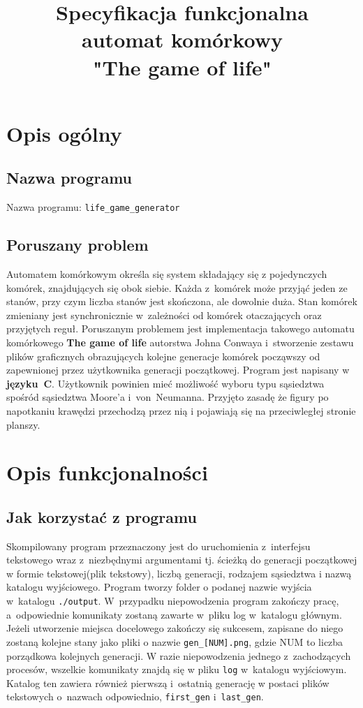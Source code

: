 \documentclass[a4paper,11pt]{article}
\author{}
\title{
	\Huge Specyfikacja funkcjonalna \\
	automat komórkowy\\
	\textbf{"The game of life"}
}
\begin{document}
 
	\maketitle 
	\newpage
	\tableofcontents 
	\newpage
	\section {Opis ogólny}
		\subsection{Nazwa programu} 
			Nazwa programu: \texttt{life\_game\_generator}
		\subsection{Poruszany problem}
			Automatem komórkowym określa się system składający się z pojedynczych komórek, znajdujących się obok siebie. Każda z~komórek może przyjąć jeden ze stanów, przy czym liczba stanów jest skończona, ale dowolnie duża. Stan komórek zmieniany jest synchronicznie w~zależności od komórek otaczających oraz przyjętych reguł. Poruszanym problemem jest implementacja takowego automatu komórkowego \textbf{The game of life} autorstwa Johna Conwaya i~stworzenie zestawu plików graficznych obrazujących kolejne generacje komórek począwszy od zapewnionej przez użytkownika generacji początkowej. Program jest napisany w~ \textbf{języku~C}. Użytkownik powinien mieć możliwość wyboru typu sąsiedztwa spośród sąsiedztwa Moore'a i~von~Neumanna. Przyjęto zasadę że figury po napotkaniu krawędzi przechodzą przez nią i pojawiają się na przeciwległej stronie planszy.	
	\section{Opis funkcjonalności}
		\subsection{Jak korzystać z programu}
			Skompilowany program przeznaczony jest do uruchomienia z~interfejsu tekstowego wraz z~niezbędnymi argumentami tj. ścieżką do generacji początkowej w formie tekstowej(plik tekstowy), liczbą generacji, rodzajem sąsiedztwa i nazwą katalogu wyjściowego. Program tworzy folder o podanej nazwie wyjścia w~katalogu \texttt{./output}. W~przypadku niepowodzenia program zakończy pracę, a~odpowiednie komunikaty zostaną zawarte
			w~pliku log w~katalogu głównym. Jeżeli utworzenie miejsca docelowego zakończy się sukcesem, zapisane do niego zostaną kolejne stany jako pliki o nazwie \texttt{gen\_[NUM].png}, gdzie NUM to liczba porządkowa kolejnych generacji. W razie niepowodzenia jednego z~zachodzących procesów, wszelkie komunikaty znajdą się w pliku \texttt{log} w~katalogu wyjściowym.
			Katalog ten zawiera również pierwszą i~ostatnią generację w postaci plików tekstowych o~nazwach odpowiednio, \texttt{first\_gen} i~\texttt{last\_gen}.
\end{document}
